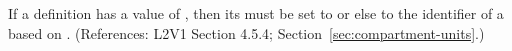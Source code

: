 If a \Compartment definition has a  value of
, then its  must be set to  or else
to the identifier of a \UnitDefinition based on .
(References: L2V1 Section 4.5.4; Section~\ref{sec:compartment-units}.)
